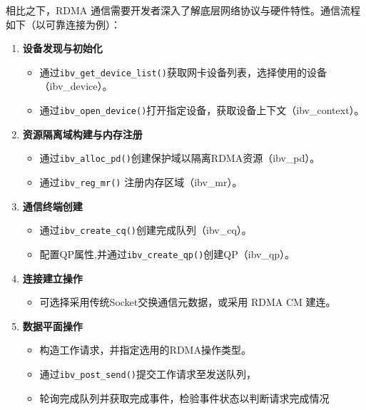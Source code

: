 {    相比之下，RDMA 通信需要开发者深入了解底层网络协议与硬件特性。通信流程如下（以可靠连接为例）：
    \begin{enumerate}[label=\textbf{步骤 \arabic*.}, leftmargin=0.5cm, align=left]
        \item \textbf{设备发现与初始化}
              \begin{itemize}
                  \item 通过\texttt{ibv\_get\_device\_list()}获取网卡设备列表，选择使用的设备（ibv\_device）。
                  \item 通过\texttt{ibv\_open\_device()}打开指定设备，获取设备上下文（ibv\_context）。
              \end{itemize}

        \item \textbf{资源隔离域构建与内存注册}
              \begin{itemize}
                  \item 通过\texttt{ibv\_alloc\_pd()}创建保护域以隔离RDMA资源（ibv\_pd）。
                  \item 通过\texttt{ibv\_reg\_mr()} 注册内存区域（ibv\_mr）。
              \end{itemize}

        \item \textbf{通信终端创建}
              \begin{itemize}
                  \item 通过\texttt{ibv\_create\_cq()}创建完成队列（ibv\_cq）。
                  \item 配置QP属性,并通过\texttt{ibv\_create\_qp()}创建QP（ibv\_qp）。
              \end{itemize}

        \item \textbf{连接建立操作}
              \begin{itemize}
                  \item 可选择采用传统Socket交换通信元数据，或采用 RDMA CM 建连。
              \end{itemize}

        \item \textbf{数据平面操作}
              \begin{itemize}
                  \item 构造工作请求，并指定选用的RDMA操作类型。
                  \item 通过\texttt{ibv\_post\_send()}提交工作请求至发送队列，
                  \item 轮询完成队列并获取完成事件，检验事件状态以判断请求完成情况
              \end{itemize}


\end{enumerate}}
